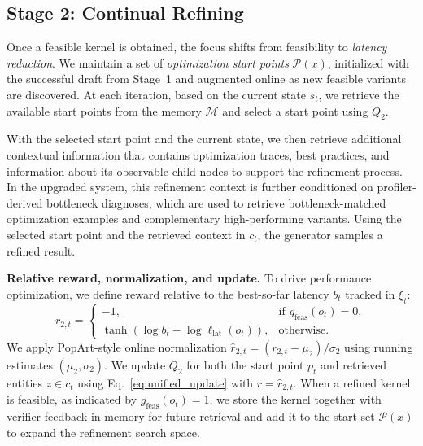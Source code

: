 \documentclass{article} %
\theoremstyle{definition}
\theoremstyle{remark}
\begin{document}
\subsection{Stage 2: Continual Refining}
\label{sec:stage2}
Once a feasible kernel is obtained, the focus shifts from feasibility to \emph{latency reduction}.
We maintain a set of \emph{optimization start points}  $\mathcal{P}(x)$, initialized with the successful draft from Stage~1 and augmented online as new feasible variants are discovered.
At each iteration, based on the current state $s_t$, we retrieve the available start points from the memory $\mathcal{M}$ and select a start point using $Q_2$.

With the selected start point and the current state, we then retrieve additional contextual information that contains optimization traces, best practices, and information about its observable child nodes to support the refinement process. In the upgraded system, this refinement context is further conditioned on profiler-derived bottleneck diagnoses, which are used to retrieve bottleneck-matched optimization examples and complementary high-performing variants.
Using the selected start point and the retrieved context in $c_t$, the generator samples a refined result.

\textbf{Relative reward, normalization, and update.}
To drive performance optimization, we define reward relative to the best-so-far latency $b_{t}$ tracked in $\xi_{t}$:
\begin{equation}
r_{2,t} =
\begin{cases}
-1, & \text{if } g_{\text{feas}}(o_t)=0,\\
\tanh\!\left(\log b_{t} - \log \ell_{\text{lat}}(o_t)\right), & \text{otherwise}.
\end{cases}
\end{equation}
We apply PopArt-style online normalization $\hat{r}_{2,t} = (r_{2,t}-\mu_2)/\sigma_2$ using running estimates $(\mu_2,\sigma_2)$.
We update $Q_{2}$ for both the start point $p_t$ and retrieved entities $z \in c_t$ using Eq.~\ref{eq:unified_update} with $r=\hat{r}_{2,t}$.
When a refined kernel is feasible, as indicated by $g_{\text{feas}}(o_t)=1$, we store the kernel together with verifier feedback in memory for future retrieval and add it to the start set $\mathcal{P}(x)$ to expand the refinement search space.
\end{document}
